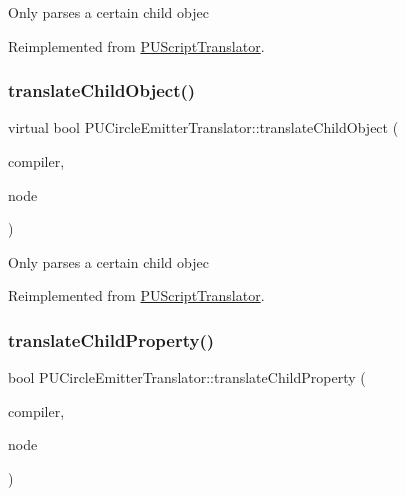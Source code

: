 Only parses a certain child objec 

Reimplemented from \hyperlink{classPUScriptTranslator_ab587d01348ae3e678cb700c719b2b113}{P\+U\+Script\+Translator}.

\mbox{\label{classPUCircleEmitterTranslator_a2d7857dbf573e2f094fb151d4581ebd2}} 
\subsubsection{\texorpdfstring{translate\+Child\+Object()}{translateChildObject()}\hspace{0.1cm}{\footnotesize\ttfamily [2/2]}}
{\footnotesize\ttfamily virtual bool P\+U\+Circle\+Emitter\+Translator\+::translate\+Child\+Object (\begin{DoxyParamCaption}\item[{\hyperlink{classPUScriptCompiler}{P\+U\+Script\+Compiler} $\ast$}]{compiler,  }\item[{\hyperlink{classPUAbstractNode}{P\+U\+Abstract\+Node} $\ast$}]{node }\end{DoxyParamCaption})\hspace{0.3cm}{\ttfamily [virtual]}}

Only parses a certain child objec 

Reimplemented from \hyperlink{classPUScriptTranslator_ab587d01348ae3e678cb700c719b2b113}{P\+U\+Script\+Translator}.

\mbox{\label{classPUCircleEmitterTranslator_a90ff348c065a8ebf8d907de94028db14}} 
\subsubsection{\texorpdfstring{translate\+Child\+Property()}{translateChildProperty()}\hspace{0.1cm}{\footnotesize\ttfamily [1/2]}}
{\footnotesize\ttfamily bool P\+U\+Circle\+Emitter\+Translator\+::translate\+Child\+Property (\begin{DoxyParamCaption}\item[{\hyperlink{classPUScriptCompiler}{P\+U\+Script\+Compiler} $\ast$}]{compiler,  }\item[{\hyperlink{classPUAbstractNode}{P\+U\+Abstract\+Node} $\ast$}]{node }\end{DoxyParamCaption})\hspace{0.3cm}{\ttfamily [virtual]}}

